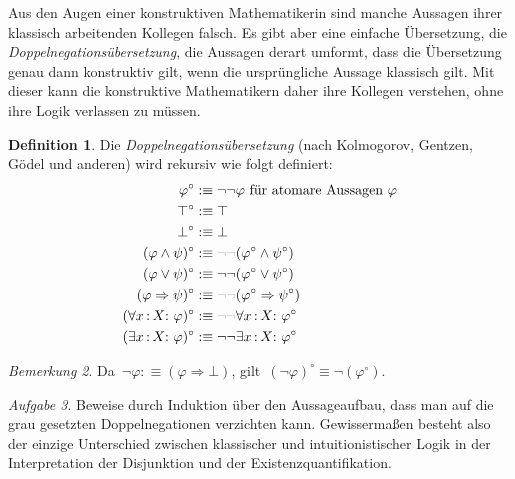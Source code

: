 \documentclass[a4paper,ngerman,12pt]{scrartcl}
\theoremstyle{definition}
\newtheorem{defn}{Definition}[section]
\theoremstyle{plain}
\theoremstyle{remark}
\newtheorem{bem}[defn]{Bemerkung}
\newtheorem{aufg}[defn]{Aufgabe}
\renewcommand{\_}{\mathpunct{.}\,}
\newcommand{\?}{\,{:}\,}
\begin{document}
Aus den Augen einer konstruktiven Mathematikerin sind manche Aussagen ihrer
klassisch arbeitenden Kollegen falsch. Es gibt aber eine einfache Übersetzung,
die \emph{Doppel\-ne\-ga\-tions\-über\-set\-zung}, die Aussagen derart umformt, dass die
Übersetzung genau dann konstruktiv gilt, wenn die ursprüngliche Aussage
klassisch gilt. Mit dieser kann die konstruktive Mathematikern daher ihre
Kollegen verstehen, ohne ihre Logik verlassen zu müssen.

\begin{defn}Die \emph{Doppelnegationsübersetzung} (nach Kolmogorov, Gentzen,
Gödel und anderen) wird rekursiv wie folgt definiert:
\newcommand{\optnegneg}{\textcolor{grey}{\neg\neg}}
\begin{align*}
  \varphi^\circ &:\equiv \neg\neg \varphi \text{ für atomare Aussagen~$\varphi$} \\
  \top^\circ &:\equiv \top \\
  \bot^\circ &:\equiv \bot \\
  (\varphi \wedge \psi)^\circ &:\equiv \optnegneg(\varphi^\circ \wedge \psi^\circ) \\
  (\varphi \vee \psi)^\circ &:\equiv \neg\neg(\varphi^\circ \vee \psi^\circ) \\
  (\varphi \Rightarrow \psi)^\circ &:\equiv \optnegneg(\varphi^\circ \Rightarrow \psi^\circ) \\
  (\forall x\?X{:}\ \varphi)^\circ &:\equiv \optnegneg\forall x\?X{:}\ \varphi^\circ \\
  (\exists x\?X{:}\ \varphi)^\circ &:\equiv \neg\neg\exists x\?X{:}\ \varphi^\circ
\end{align*}
\end{defn}

\begin{bem}Da~$\neg\varphi :\equiv (\varphi \Rightarrow \bot)$,
gilt~$(\neg\varphi)^\circ \equiv \neg(\varphi^\circ)$.\end{bem}

\begin{aufg}Beweise durch Induktion über den Aussageaufbau, dass man auf die grau
gesetzten Doppelnegationen verzichten kann. Gewissermaßen besteht also der
einzige Unterschied zwischen klassischer und intuitionistischer Logik in der
Interpretation der Disjunktion und der Existenzquantifikation.\end{aufg}
\end{document}
